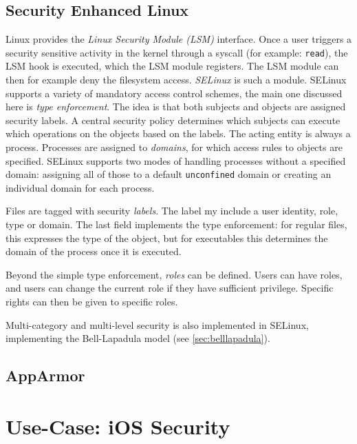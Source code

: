 \subsection{Security Enhanced Linux}
Linux provides the \emph{Linux Security Module (LSM)} interface. Once a user
triggers a security sensitive activity in the kernel through a syscall (for
example: \texttt{read}), the LSM hook is executed, which the LSM module
registers. The LSM module can then for example deny the filesystem access.
\emph{SELinux} is such a module. SELinux supports a variety of mandatory access
control schemes, the main one discussed here is \emph{type enforcement}. The
idea is that both subjects and objects are assigned security labels. A central
security policy determines which subjects can execute which operations on the
objects based on the labels. The acting entity is always a process. Processes
are assigned to \emph{domains}, for which access rules to objects are specified.
SELinux supports two modes of handling processes without a specified domain:
assigning all of those to a default \texttt{unconfined} domain or creating an
individual domain for each process.

Files are tagged with security \emph{labels}. The label my include a user identity,
role, type or domain. The last field implements the type enforcement: for
regular files, this expresses the type of the object, but for executables this
determines the domain of the process once it is executed.

Beyond the simple type enforcement, \emph{roles} can be defined. Users can have
roles, and users can change the current role if they have sufficient privilege.
Specific rights can then be given to specific roles.

Multi-category and multi-level security is also implemented in SELinux,
implementing the Bell-Lapadula model (see \cref{sec:belllapadula}).

\subsection{AppArmor}

\section{Use-Case: iOS Security}
